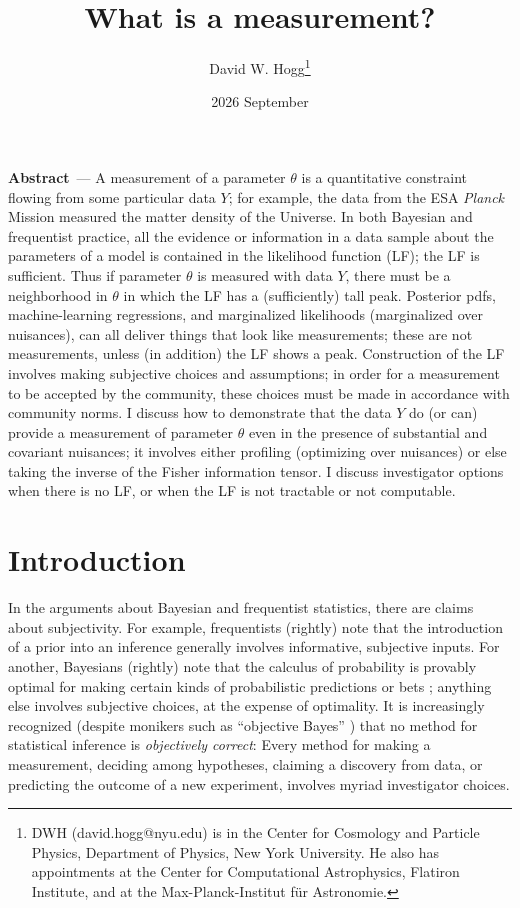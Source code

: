 \documentclass{article}
\title{\bfseries
What is a measurement?}
\author{David W. Hogg\footnote{%
DWH (david.hogg@nyu.edu) is in the Center for Cosmology and Particle Physics, Department of Physics, New York University.
He also has appointments at the Center for Computational Astrophysics, Flatiron Institute, and at the Max-Planck-Institut f\"ur Astronomie.}}
\date{2026 September}
\renewcommand{\paragraph}[1]{\bigskip\par\noindent\textbf{#1}~---}
\begin{document}
\maketitle\thispagestyle{empty}

\paragraph{Abstract}
A measurement of a parameter $\theta$ is a quantitative constraint flowing from some particular data $Y$; for example, the data from the ESA \textsl{Planck} Mission measured the matter density of the Universe.
In both Bayesian and frequentist practice, all the evidence or information in a data sample about the parameters of a model is contained in the likelihood function (LF); the LF is sufficient.
Thus if parameter $\theta$ is measured with data $Y$, there must be a neighborhood in $\theta$ in which the LF has a (sufficiently) tall peak.
Posterior pdfs, machine-learning regressions, and marginalized likelihoods (marginalized over nuisances), can all deliver things that look like measurements; these are not measurements, unless (in addition) the LF shows a peak.
Construction of the LF involves making subjective choices and assumptions; in order for a measurement to be accepted by the community, these choices must be made in accordance with community norms.
I discuss how to demonstrate that the data $Y$ do (or can) provide a measurement of parameter $\theta$ even in the presence of substantial and covariant nuisances; it involves either profiling (optimizing over nuisances) or else taking the inverse of the Fisher information tensor.
I discuss investigator options when there is no LF, or when the LF is not tractable or not computable.

\section{Introduction}\label{sec:intro}
In the arguments about Bayesian and frequentist statistics, there are claims about subjectivity.
For example, frequentists (rightly) note that the introduction of a prior into an inference generally involves informative, subjective inputs.
For another, Bayesians (rightly) note that the calculus of probability is provably optimal for making certain kinds of probabilistic predictions or bets \cite{jaynes}; anything else involves subjective choices, at the expense of optimality.
It is increasingly recognized (despite monikers such as ``objective Bayes'' \cite{objective}) that no method for statistical inference is \emph{objectively correct}:
Every method for making a measurement, deciding among hypotheses, claiming a discovery from data, or predicting the outcome of a new experiment, involves myriad investigator choices.
\end{document}
